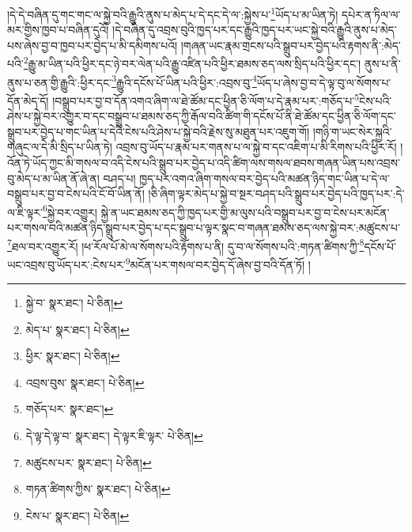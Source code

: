 །དེ་དེ་བཞིན་དུ་གང་གང་ལ་སྐྱེ་བའི་རྒྱུའི་ནུས་པ་མེད་པ་དེ་དང་དེ་ལ་:སྐྱེས་པ་\footnote{སྐྱེ་བ་  སྣར་ཐང་།  པེ་ཅིན། }ཡོད་པ་མ་ཡིན་ཏེ། དཔེར་ན་ཏིལ་ལ་མར་གྱིས་ཁྱབ་པ་བཞིན་དུའོ། །དེ་བཞིན་དུ་འབྲས་བུའི་ཁྱད་པར་དང་རྒྱུའི་ཁྱད་པར་ཡང་སྐྱེ་བའི་རྒྱུའི་ནུས་པ་མེད་པས་ཞེས་བྱ་བ་ཁྱབ་པར་བྱེད་པ་མི་དམིགས་པའོ། །གཞན་ཡང་རྣམ་གྲངས་པའི་སྒྲུབ་པར་བྱེད་པའི་རྟགས་ནི་:མེད་པའི་\footnote{མེད་པ་  སྣར་ཐང་།  པེ་ཅིན། }རྒྱུ་མ་ཡིན་པའི་ཕྱིར་དང་ཉེ་བར་ལེན་པའི་རྒྱུ་འཛིན་པའི་ཕྱིར་ཐམས་ཅད་ལས་སྲིད་པའི་ཕྱིར་དང་། ནུས་པ་ནི་ནུས་པ་ཅན་གྱི་རྒྱུའི་:ཕྱིར་དང་\footnote{ཕྱིར་  སྣར་ཐང་།  པེ་ཅིན། }རྒྱུའི་དངོས་པོ་ཡིན་པའི་ཕྱིར་:འབྲས་བུ་\footnote{འབྲས་བུས་  སྣར་ཐང་།  པེ་ཅིན། }ཡོད་པ་ཞེས་བྱ་བ་དེ་ལྟ་བུ་ལ་སོགས་པ་དོན་མེད་དོ། །བསྒྲུབ་པར་བྱ་བ་དོན་འགའ་ཞིག་ལ་ཐེ་ཚོམ་དང་ཕྱིན་ཅི་ལོག་པ་དེ་རྣམ་པར་:གཅོད་པ་\footnote{གཅོད་པར་  སྣར་ཐང་། }ངེས་པའི་ཤེས་པ་སྐྱེ་བར་འགྱུར་བ་དང་བསྒྲུབ་པ་ཐམས་ཅད་ཀྱི་རྒོལ་བའི་ཚིག་གི་དངོས་པོ་ནི་ཐེ་ཚོམ་དང་ཕྱིན་ཅི་ལོག་དང་སྒྲུབ་པར་བྱེད་པ་གང་ཡིན་པ་དེའི་ངེས་པའི་ཤེས་པ་སྐྱེ་བའི་རྗེས་སུ་མཐུན་པར་འཇུག་གོ། །གཉི་ག་ཡང་སེར་སྐྱའི་གཞུང་ལ་དེ་མི་སྲིད་པ་ཡིན་ཏེ། འབྲས་བུ་ཡོད་པ་རྣམ་པར་གནས་པ་ལ་སྐྱེ་བ་དང་འཇིག་པ་མི་རིགས་པའི་ཕྱིར་རོ། །འོན་ཏེ་ཡོད་ཀྱང་མི་གསལ་བ་འདི་ངེས་པའི་སྒྲུབ་པར་བྱེད་པ་འདི་ཚིག་ལས་གསལ་ཐབས་གཞན་ཡིན་པས་འབྲས་བུ་མེད་པ་མ་ཡིན་ནོ་ཞེ་ན། བཤད་པ། ཁྱད་པར་འགའ་ཞིག་གསལ་བར་བྱེད་པའི་མཚན་ཉིད་གང་ཡིན་པ་དེ་ལ་བསྒྲུབ་པར་བྱ་བ་ངེས་པའི་ངོ་བོ་ཡིན་ནོ། །ཅི་ཞིག་ལྟར་མེད་པ་སྐྱེ་བ་སྔར་བཤད་པའི་སྒྲུབ་པར་བྱེད་པའི་ཁྱད་པར་:དེ་ལ་ཇི་ལྟར་\footnote{དེ་ལྟ་དེ་ལྟ་བ་  སྣར་ཐང་། དེ་ལྟར་ཇི་ལྟར་  པེ་ཅིན། }སྐྱེ་བར་འགྱུར། སྐྱེ་ན་ཡང་ཐམས་ཅད་ཀྱི་ཁྱད་པར་གྱི་མ་ལུས་པའི་བསྒྲུབ་པར་བྱ་བ་ངེས་པར་མངོན་པར་གསལ་བའི་མཚན་ཉིད་སྒྲུབ་པར་བྱེད་པ་དང་སྒྲུབ་པ་ལྟར་སྣང་བ་གཞན་ཐམས་ཅད་ལས་སྐྱེ་བར་:མཚུངས་པ་\footnote{མཚུངས་པར་  སྣར་ཐང་།  པེ་ཅིན། }ཐལ་བར་འགྱུར་རོ། །ཕ་རོལ་པོ་མེ་ལ་སོགས་པའི་རྟོགས་པ་ནི། དུ་བ་ལ་སོགས་པའི་:གཏན་ཚིགས་ཀྱི་\footnote{གཏན་ཚིགས་ཀྱིས་  སྣར་ཐང་།  པེ་ཅིན། }དངོས་པོ་ཡང་འབྲས་བུ་ཡོད་པར་:ངེས་པར་\footnote{ངེས་པ་  སྣར་ཐང་།  པེ་ཅིན། }མངོན་པར་གསལ་བར་བྱེད་དོ་ཞེས་བྱ་བའི་དོན་ཏོ། །
